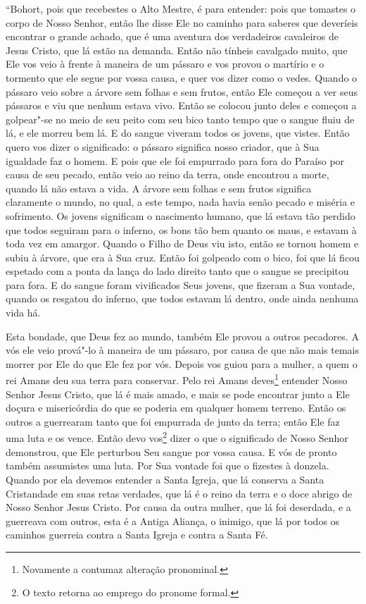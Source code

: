 “Bohort, pois que recebestes o Alto Mestre, é para entender: pois que tomastes o
corpo de Nosso Senhor, então lhe disse Ele no caminho para saberes que
deveríeis encontrar o grande achado, que é uma aventura dos verdadeiros
cavaleiros de Jesus Cristo, que lá estão na demanda. Então não tínheis
cavalgado muito, que Ele vos veio à frente à maneira de um pássaro e vos provou
o martírio e o tormento que ele segue por vossa causa, e quer vos dizer como o
vedes. Quando o pássaro veio sobre a árvore sem folhas e sem frutos, então Ele
começou a ver seus pássaros e viu que nenhum estava vivo. Então se colocou
junto deles e começou a golpear"-se no meio de seu peito com seu bico tanto
tempo que o sangue fluiu de lá, e ele morreu bem lá. E do sangue viveram todos
os jovens, que vistes. Então quero vos dizer o significado: o pássaro significa
nosso criador, que à Sua igualdade faz o homem. E pois que ele foi empurrado
para fora do Paraíso por causa de seu pecado, então veio ao reino da terra,
onde encontrou a morte, quando lá não estava a vida. A árvore sem folhas e sem
frutos significa claramente o mundo, no qual, a este tempo, nada havia senão
pecado e miséria e sofrimento. Os jovens significam o nascimento humano, que lá
estava tão perdido que todos seguiram para o inferno, os bons tão bem quanto os
maus, e estavam à toda vez em amargor. Quando o Filho de Deus viu isto, então
se tornou homem e subiu à árvore, que era à Sua cruz. Então foi golpeado com o
bico, foi que lá ficou espetado com a ponta da lança do lado direito tanto que
o sangue se precipitou para fora. E do sangue foram vivificados Seus jovens,
que fizeram a Sua vontade, quando os resgatou do inferno, que todos estavam lá
dentro, onde ainda nenhuma vida há. 

Esta bondade, que Deus fez ao mundo, também Ele provou a outros pecadores. A vós
ele veio prová"-lo à maneira de um pássaro, por causa de que não mais temais
morrer por Ele do que Ele fez por vós. Depois vos guiou para a mulher, a quem o
rei Amans deu sua terra para conservar. Pelo rei Amans deves\footnote{
Novamente a contumaz alteração pronominal. } entender Nosso Senhor
Jesus Cristo, que lá é mais amado, e mais se pode encontrar junto a Ele doçura
e misericórdia do que se poderia em qualquer homem terreno. Então os outros a
guerrearam tanto que foi empurrada de junto da terra; então Ele faz uma luta e
os vence. Então devo vos\footnote{ O texto retorna ao emprego
do pronome formal.}  dizer o que o significado de Nosso Senhor
demonstrou, que Ele perturbou Seu sangue por vossa causa. E vós de pronto
também assumistes uma luta. Por Sua vontade foi que o fizestes à donzela.
Quando por ela devemos entender a Santa Igreja, que lá conserva a Santa
Cristandade em suas retas verdades, que lá é o reino da terra e o doce abrigo
de Nosso Senhor Jesus Cristo. Por causa da outra mulher, que lá foi deserdada,
e a guerreava com outros, esta é a Antiga Aliança, o inimigo, que lá por todos
os caminhos guerreia contra a Santa Igreja e contra a Santa Fé.

